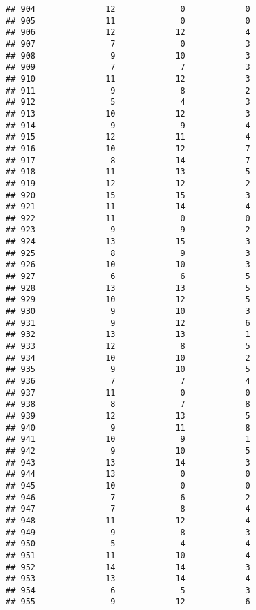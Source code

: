 \documentclass[
]{article}
\begin{document}
\begin{verbatim}
## 904              12             0            0
## 905              11             0            0
## 906              12            12            4
## 907               7             0            3
## 908               9            10            3
## 909               7             7            3
## 910              11            12            3
## 911               9             8            2
## 912               5             4            3
## 913              10            12            3
## 914               9             9            4
## 915              12            11            4
## 916              10            12            7
## 917               8            14            7
## 918              11            13            5
## 919              12            12            2
## 920              15            15            3
## 921              11            14            4
## 922              11             0            0
## 923               9             9            2
## 924              13            15            3
## 925               8             9            3
## 926              10            10            3
## 927               6             6            5
## 928              13            13            5
## 929              10            12            5
## 930               9            10            3
## 931               9            12            6
## 932              13            13            1
## 933              12             8            5
## 934              10            10            2
## 935               9            10            5
## 936               7             7            4
## 937              11             0            0
## 938               8             7            8
## 939              12            13            5
## 940               9            11            8
## 941              10             9            1
## 942               9            10            5
## 943              13            14            3
## 944              13             0            0
## 945              10             0            0
## 946               7             6            2
## 947               7             8            4
## 948              11            12            4
## 949               9             8            3
## 950               5             4            4
## 951              11            10            4
## 952              14            14            3
## 953              13            14            4
## 954               6             5            3
## 955               9            12            6

\end{verbatim}
\end{document}
